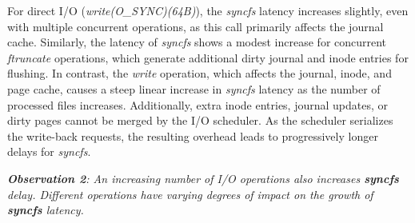For direct I/O (\textit{write(O\_SYNC)(64B)}), the \textit{syncfs} latency increases slightly, even with multiple concurrent operations, as this call primarily affects the journal cache. Similarly, the latency of \textit{syncfs} shows a modest increase for concurrent \textit{ftruncate} operations, which generate additional dirty journal and inode entries for flushing. In contrast, the \textit{write} operation, which affects the journal, inode, and page cache, causes a steep linear increase in \textit{syncfs} latency as the number of processed files increases. Additionally, extra inode entries, journal updates, or dirty pages cannot be merged by the I/O scheduler. As the scheduler serializes the write-back requests, the resulting overhead leads to progressively longer delays for \textit{syncfs}.

\begin{tcolorbox}[colback=gray!10,colframe=black,boxrule=0.5pt,arc=2mm,outer arc=2mm,]
\textit{\textbf{Observation 2}: An increasing number of I/O operations also increases \textbf{syncfs} delay. Different operations have varying degrees of impact on the growth of \textbf{syncfs} latency.}
\end{tcolorbox}





